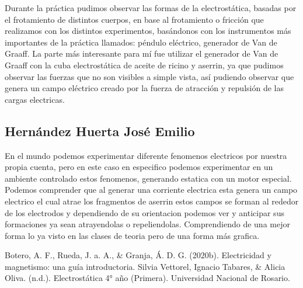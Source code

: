 \documentclass[14pt]{article}
\begin{document}
Durante la práctica pudimos observar las formas de la electrostática, basadas por el frotamiento de distintos cuerpos, en base al frotamiento o fricción que realizamos con los distintos experimentos, basándonos con los instrumentos más importantes de la práctica llamados: péndulo eléctrico, generador de Van de Graaff. La parte más interesante para mí fue utilizar el generador de Van de Graaff con la cuba electrostática de aceite de ricino y aserrin, ya que pudimos observar las fuerzas que no son visibles a simple vista, así pudiendo observar que genera un campo eléctrico creado por la fuerza de atracción y repulsión de las cargas electricas.

\subsection{Hernández Huerta José Emilio}
En el mundo podemos experimentar diferente fenomenos electricos por nuestra propia cuenta, pero en este caso en especifico podemos experimentar en un ambiente controlado estos fenomenos, generando estatica con un motor especial. 
Podemos comprender que al generar una corriente electrica esta genera un campo electrico el cual atrae los fragmentos de aserrin estos campos se forman al rededor de los electrodos y dependiendo de su orientacion podemos ver y anticipar sus formaciones ya sean atrayendolas o repeliendolas. Comprendiendo de una mejor forma lo ya visto en las clases de teoria pero de una forma más grafica.


\clearpage
\newpage	
	\begin{thebibliography}{0}
		Botero, A. F., Rueda, J. a. A., & Granja, Á. D. G. (2020b). Electricidad y magnetismo: una guía introductoria.
		Silvia Vettorel, Ignacio Tabares, & Alicia Oliva. (n.d.). Electrostática 4° año (Primera). Universidad Nacional de Rosario.
	\end{thebibliography}
\end{document}
